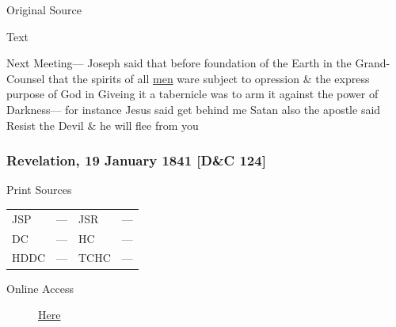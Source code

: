 				\begin{description}
					\item[Original Source]
				\end{description}
				
				
				\begin{description}
					\item[Text]
				\end{description}
				
					Next Meeting--- Joseph said that before foundation of the Earth in the Grand-Counsel that the spirits of all \uline{men} ware subject to opression \& the express purpose of God in Giveing it a tabernicle was to arm it against the power of Darkness--- for instance Jesus said get behind me Satan also the apostle said Resist the Devil \& he will flee from you
					
		\subsubsection{Revelation, 19 January 1841 [D\&C 124]}
			\label{EMS-1841-JS-19-JAN-1841}
			
			\begin{description}
				\item[Print Sources]
			\end{description}

			\begin{tabular}{p{0.5in}p{1in}p{0.5in}p{1in}}
				JSP	 	& ---		& JSR 		& --- \\
				DC	 	& ---		& HC 		& --- \\
				HDDC 	& ---		& TCHC 		& --- \\
			\end{tabular}
			
			\begin{description}
				\item[Online Access] \href{https://www.josephsmithpapers.org/paper-summary/revelation-19-january-1841-dc-124/1}{Here}
			\end{description}
			
